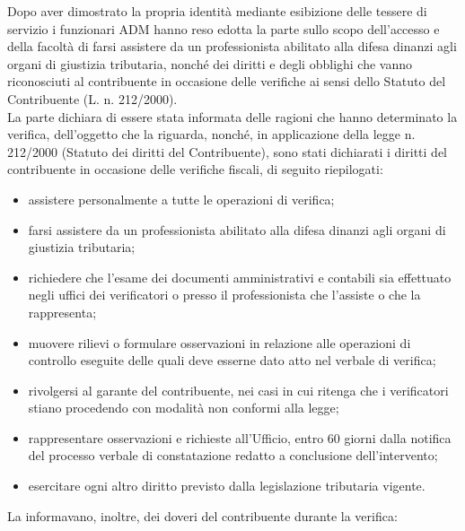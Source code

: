 \documentclass[12pt]{article}
\begin{document}
Dopo aver dimostrato la propria identità mediante esibizione delle tessere di servizio i funzionari ADM hanno reso edotta la parte sullo scopo dell’accesso e della facoltà di farsi assistere da un professionista abilitato alla difesa dinanzi agli organi di giustizia tributaria, nonché dei diritti e degli obblighi che vanno riconosciuti al contribuente in occasione delle verifiche ai sensi dello Statuto del Contribuente (L. n. 212/2000).\\
La parte dichiara di essere stata informata delle ragioni che hanno determinato la verifica, dell’oggetto che la riguarda, nonché, in applicazione della legge n. 212/2000 (Statuto dei diritti del Contribuente), sono stati dichiarati i diritti del contribuente in occasione delle verifiche fiscali, di seguito riepilogati:
\begin{itemize}
    \item assistere personalmente a tutte le operazioni di verifica;
    \item farsi assistere da un professionista abilitato alla difesa dinanzi agli organi di giustizia tributaria;
    \item richiedere che l’esame dei documenti amministrativi e contabili sia effettuato negli uffici dei verificatori o presso il professionista che l’assiste o che la rappresenta;
    \item muovere rilievi o formulare osservazioni in relazione alle operazioni di controllo eseguite delle quali deve esserne dato atto nel verbale di verifica;
    \item rivolgersi al garante del contribuente, nei casi in cui ritenga che i verificatori stiano procedendo con modalità non conformi alla legge;
    \item rappresentare osservazioni e richieste all’Ufficio, entro 60 giorni dalla notifica del processo verbale di constatazione redatto a conclusione dell’intervento;
    \item esercitare ogni altro diritto previsto dalla legislazione tributaria vigente.
\end{itemize}
La informavano, inoltre, dei doveri del contribuente durante la verifica:
\end{document}

